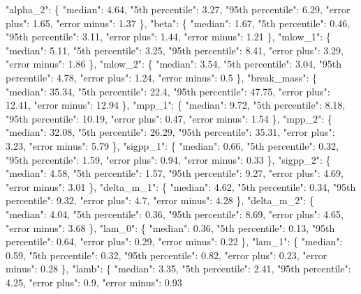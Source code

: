 {{      "alpha\_2": \{%
        "median": 4.64, %
        "5th percentile": 3.27, %
        "95th percentile": 6.29, %
        "error plus": 1.65, %
        "error minus": 1.37%
      \}, %
      "beta": \{%
        "median": 1.67, %
        "5th percentile": 0.46, %
        "95th percentile": 3.11, %
        "error plus": 1.44, %
        "error minus": 1.21%
      \}, %
      "mlow\_1": \{%
        "median": 5.11, %
        "5th percentile": 3.25, %
        "95th percentile": 8.41, %
        "error plus": 3.29, %
        "error minus": 1.86%
      \}, %
      "mlow\_2": \{%
        "median": 3.54, %
        "5th percentile": 3.04, %
        "95th percentile": 4.78, %
        "error plus": 1.24, %
        "error minus": 0.5%
      \}, %
      "break\_mass": \{%
        "median": 35.34, %
        "5th percentile": 22.4, %
        "95th percentile": 47.75, %
        "error plus": 12.41, %
        "error minus": 12.94%
      \}, %
      "mpp\_1": \{%
        "median": 9.72, %
        "5th percentile": 8.18, %
        "95th percentile": 10.19, %
        "error plus": 0.47, %
        "error minus": 1.54%
      \}, %
      "mpp\_2": \{%
        "median": 32.08, %
        "5th percentile": 26.29, %
        "95th percentile": 35.31, %
        "error plus": 3.23, %
        "error minus": 5.79%
      \}, %
      "sigpp\_1": \{%
        "median": 0.66, %
        "5th percentile": 0.32, %
        "95th percentile": 1.59, %
        "error plus": 0.94, %
        "error minus": 0.33%
      \}, %
      "sigpp\_2": \{%
        "median": 4.58, %
        "5th percentile": 1.57, %
        "95th percentile": 9.27, %
        "error plus": 4.69, %
        "error minus": 3.01%
      \}, %
      "delta\_m\_1": \{%
        "median": 4.62, %
        "5th percentile": 0.34, %
        "95th percentile": 9.32, %
        "error plus": 4.7, %
        "error minus": 4.28%
      \}, %
      "delta\_m\_2": \{%
        "median": 4.04, %
        "5th percentile": 0.36, %
        "95th percentile": 8.69, %
        "error plus": 4.65, %
        "error minus": 3.68%
      \}, %
      "lam\_0": \{%
        "median": 0.36, %
        "5th percentile": 0.13, %
        "95th percentile": 0.64, %
        "error plus": 0.29, %
        "error minus": 0.22%
      \}, %
      "lam\_1": \{%
        "median": 0.59, %
        "5th percentile": 0.32, %
        "95th percentile": 0.82, %
        "error plus": 0.23, %
        "error minus": 0.28%
      \}, %
      "lamb": \{%
        "median": 3.35, %
        "5th percentile": 2.41, %
        "95th percentile": 4.25, %
        "error plus": 0.9, %
        "error minus": 0.93%
}}
